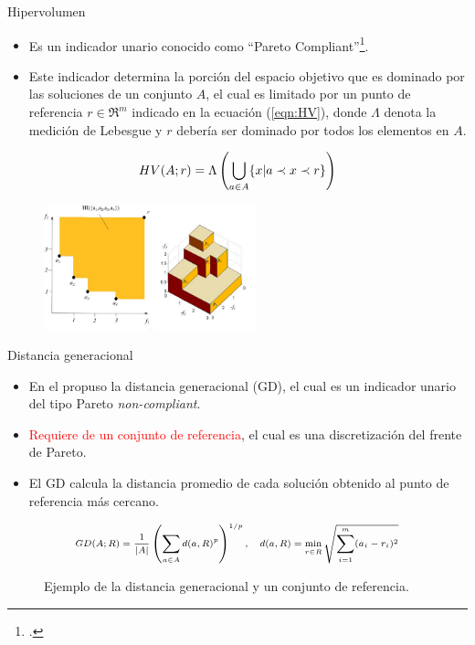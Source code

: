 \documentclass{beamer}
\begin{document}
\begin{frame}{Hipervolumen}
\begin{itemize}
\scriptsize
\justifying
\item Es un indicador unario conocido como ``Pareto Compliant''\footcite{zitzler1999evolutionary}.
\item Este indicador determina la porción del espacio objetivo que es dominado por las soluciones de un conjunto $A$, el cual es limitado por un punto de referencia $r \in \Re^m$ indicado en la ecuación (\ref{eqn:HV}), donde $\Lambda$ denota la medición de Lebesgue y $r$ debería ser dominado por todos los elementos en $A$.
\end{itemize}
\begin{equation}\label{eqn:HV}
\scriptsize
    HV(A;r) = \Lambda \left (  \bigcup_{a \in A} \{ x | a \prec x \prec r \} \right )
\end{equation}

\begin{figure}[H]
\centering
\includegraphics[width=0.55\textwidth]{Images/HV.jpg}
\end{figure}
\end{frame}

\begin{frame}{Distancia generacional}
\begin{itemize}
\justifying
\scriptsize
\item En el \citeyear{Joel:GD} \citeauthor{Joel:GD} propuso la distancia generacional (GD), el cual es un indicador unario del tipo Pareto \textit{non-compliant}.
\item \textcolor{red}{Requiere de un conjunto de referencia}, el cual es una discretización del frente de Pareto.
\item El GD calcula la distancia promedio de cada solución obtenido al punto de referencia más cercano.
\end{itemize}
\begin{equation*}
\scriptsize
\begin{split}
GD(A; R) = \frac{1}{|A|} \left (   \sum_{a \in A} d(a, R)^p \right)^{1/p}, \quad d(a, R) = \min_{r \in R} \sqrt{\sum_{i=1}^m (a_i - r_i)^2}
\end{split}
\end{equation*}
\begin{figure}[H]
\centering

\caption{\scriptsize Ejemplo de la distancia generacional y un conjunto de referencia.} 
\end{figure}
\end{frame}
\end{document}
